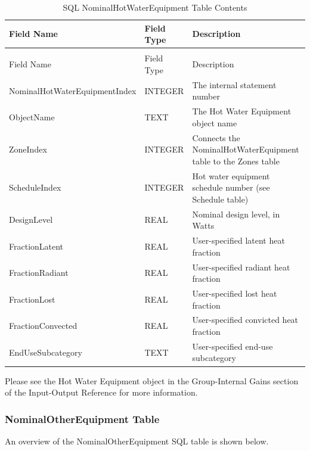 {\scriptsize
\begin{longtable}[c]{>{\raggedright}p{1.5in}>{\raggedright}p{1.5in}>{\raggedright}p{2.99in}}
\caption{SQL NominalHotWaterEquipment Table Contents \label{table:table-20.-sql-nominalhotwaterequipment-table}} \tabularnewline
\toprule
Field Name & Field Type & Description \tabularnewline
\midrule
\endfirsthead

\caption[]{SQL NominalHotWaterEquipment Table Contents} \tabularnewline
\toprule
Field Name & Field Type & Description \tabularnewline
\midrule
\endhead

Nominal\-Hot\-Water\-Equipment\-Index & INTEGER & The internal statement number \tabularnewline
ObjectName & TEXT & The Hot Water Equipment object name \tabularnewline
ZoneIndex & INTEGER & Connects the NominalHotWaterEquipment table to the Zones table \tabularnewline
ScheduleIndex & INTEGER & Hot water equipment schedule number (see Schedule table) \tabularnewline
DesignLevel & REAL & Nominal design level, in Watts \tabularnewline
FractionLatent & REAL & User-specified latent heat fraction \tabularnewline
FractionRadiant & REAL & User-specified radiant heat fraction \tabularnewline
FractionLost & REAL & User-specified lost heat fraction \tabularnewline
FractionConvected & REAL & User-specified convicted heat fraction \tabularnewline
EndUseSubcategory & TEXT & User-specified end-use subcategory \tabularnewline
\bottomrule
\end{longtable}}

Please see the Hot Water Equipment object in the Group-Internal Gains section of the Input-Output Reference for more information.

\subsubsection{NominalOtherEquipment Table}

An overview of the NominalOtherEquipment SQL table is shown below.

